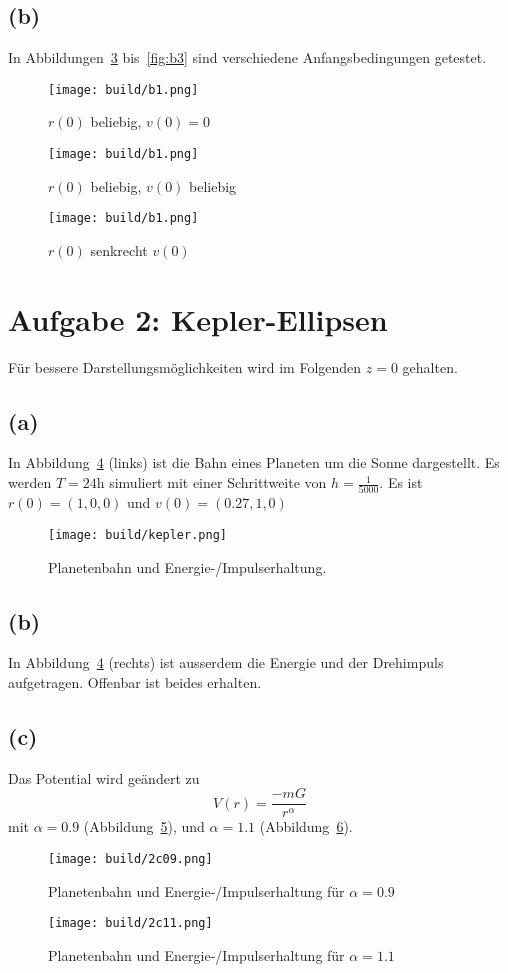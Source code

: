 \documentclass{scrartcl}
\begin{document}
\subsection*{(b)}
In Abbildungen~\ref{fig:b1} bis~\ref{fig:b3} sind verschiedene Anfangsbedingungen getestet.
\begin{figure}[ht]
  \centering
  \texttt{[image: build/b1.png]}
  \caption{$r(0)$ beliebig, $v(0) = 0$}%
  \label{fig:b1}
\end{figure}
\begin{figure}[ht]
  \centering
  \texttt{[image: build/b1.png]}
  \caption{$r(0)$ beliebig, $v(0)$ beliebig}%
  \label{fig:b1}
\end{figure}
\begin{figure}[ht]
  \centering
  \texttt{[image: build/b1.png]}
  \caption{$r(0)$ senkrecht $v(0)$}%
  \label{fig:b1}
\end{figure}

\section*{Aufgabe 2: Kepler-Ellipsen}
Für bessere Darstellungsmöglichkeiten wird im Folgenden $z = 0$ gehalten.
\subsection*{(a)}

In Abbildung~\ref{fig:kepler} (links) ist die Bahn eines Planeten um die Sonne dargestellt.
Es werden $T= 24$h simuliert mit einer Schrittweite von $h = \frac{1}{5000}$.
Es ist $r(0) = (1, 0, 0)$ und $v(0) = (0.27, 1, 0)$
\begin{figure}[ht]
  \centering
  \texttt{[image: build/kepler.png]}
  \caption{Planetenbahn und Energie-/Impulserhaltung.}%
  \label{fig:kepler}
\end{figure}
\subsection*{(b)}
In Abbildung~\ref{fig:kepler} (rechts) ist ausserdem die Energie und der Drehimpuls aufgetragen.
Offenbar ist beides erhalten.
\subsection*{(c)}
Das Potential wird geändert zu
\begin{equation}
  V(r) = \frac{-mG}{r^\alpha}
\end{equation}
mit $\alpha = 0.9$ (Abbildung~\ref{fig:2c09}),
und $\alpha = 1.1$ (Abbildung~\ref{fig:2c11}).
\begin{figure}[ht]
  \centering
  \texttt{[image: build/2c09.png]}
  \caption{Planetenbahn und Energie-/Impulserhaltung für $\alpha = 0.9$}%
  \label{fig:2c09}
\end{figure}
\begin{figure}[ht]
  \centering
  \texttt{[image: build/2c11.png]}
  \caption{Planetenbahn und Energie-/Impulserhaltung für $\alpha = 1.1$}%
  \label{fig:2c11}
\end{figure}
\end{document}
